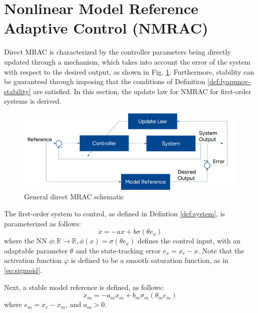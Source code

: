 \section{Nonlinear Model Reference Adaptive Control (NMRAC)}
\label{sec:NMRAC}
Direct MRAC is characterized by the controller parameters being directly updated through a mechanism, which takes into account the error of the system with respect to the desired output, as shown in Fig. \ref{fig:nonlinear-NNC-MRAC}. Furthermore, stability can be guaranteed through imposing that the conditions of Definition \ref{def:lyapunov-stability} are satisfied. In this section, the update law for NMRAC for first-order systems is derived.

\begin{figure}[!t]
 \centering
 \includegraphics[width=0.8\linewidth]{images/MRAC_Blockdiagram.png}
 \caption{General direct MRAC schematic}
 \label{fig:nonlinear-NNC-MRAC}
\end{figure}


The first-order system to control, as defined in Defintion \ref{def:system}, is parameterized as follows:
\begin{equation}
 \dot x = -ax + b\sigma(\theta e_x)
 \label{eq:first-order-system}
\end{equation}
where the NN $\phi: \mathbb{R}\rightarrow\mathbb{R}, \phi(x)=\sigma(\theta e_x)$ defines the control input, with an adaptable parameter $\theta$ and the state-tracking error $e_x=x_r - x$. Note that the activation function $\varphi$ is defined to be a smooth saturation function, as in \eqref{eq:sigmoid}. 

Next, a stable model reference is defined, as follows:
\begin{equation}
 \dot x_m = -a_mx_m + b_m\sigma_m(\theta_m e_m)
 \label{eq:first-order-ref}
\end{equation}
where $e_m=x_r - x_m$, and $a_m>0$.

